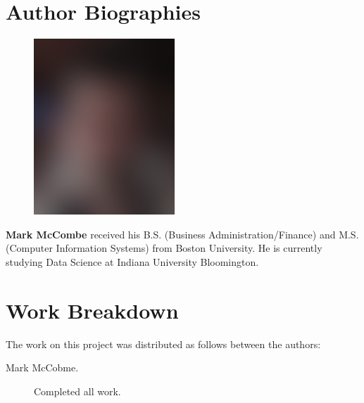 \documentclass[9pt,twocolumn,twoside]{styles/osajnl}
\begin{document}
\section*{Author Biographies}
\begingroup
\setlength\intextsep{0pt}
\begin{minipage}[t][3.2cm][t]{1.0\columnwidth} %
  \begin{figure}
    \includegraphics[width=0.25\columnwidth]{images/john_smith.eps}
  \end{figure}
  \noindent
{\bfseries Mark McCombe} received his B.S. (Business Administration/Finance) and M.S. (Computer Information Systems) from Boston University.  He is currently studying Data Science at Indiana University Bloomington.

\end{minipage}
\endgroup

\newpage

\appendix

\section{Work Breakdown}

The work on this project was distributed as follows between the
authors:

\begin{description}

\item[Mark McCobme.] Completed all work.

\end{description}
\end{document}
